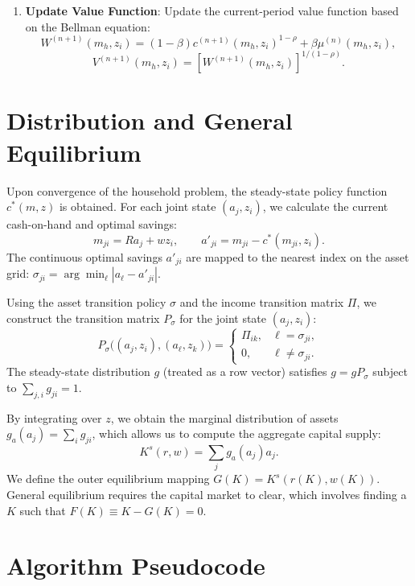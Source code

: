 \documentclass[a4paper,12pt]{article}
\newcommand{\R}{R}
\begin{document}
\begin{enumerate}
    \item \textbf{Update Value Function}: Update the current-period value function based on the Bellman equation:
    \[
        W^{(n+1)}(m_h,z_i) = (1-\beta)c^{(n+1)}(m_h,z_i)^{1-\rho} + \beta\mu^{(n)}(m_h,z_i),
    \]
    \[
        V^{(n+1)}(m_h,z_i) = \left[W^{(n+1)}(m_h,z_i)\right]^{1/(1-\rho)}.
    \]
\end{enumerate}

\section{Distribution and General Equilibrium}

Upon convergence of the household problem, the steady-state policy function $c^\ast(m,z)$ is obtained. For each joint state $(a_j,z_i)$, we calculate the current cash-on-hand and optimal savings:
\[
    m_{ji}=\R a_j+wz_i,\qquad a'_{ji}=m_{ji}-c^\ast(m_{ji},z_i).
\]
The continuous optimal savings $a'_{ji}$ are mapped to the nearest index on the asset grid: $\sigma_{ji} = \arg\min_\ell |a_\ell-a'_{ji}|$.

Using the asset transition policy $\sigma$ and the income transition matrix $\Pi$, we construct the transition matrix $P_\sigma$ for the joint state $(a_j, z_i)$:
\[
    P_\sigma\big((a_j,z_i),(a_\ell,z_k)\big)
    =
    \begin{cases}
        \Pi_{ik}, & \ell=\sigma_{ji},\\
        0, & \ell\neq\sigma_{ji}.
    \end{cases}
\]
The steady-state distribution $g$ (treated as a row vector) satisfies $g=gP_\sigma$ subject to $\sum_{j,i}g_{ji}=1$.

By integrating over $z$, we obtain the marginal distribution of assets $g_a(a_j)=\sum_i g_{ji}$, which allows us to compute the aggregate capital supply:
\[
    K^s(r,w)=\sum_j g_a(a_j)a_j.
\]
We define the outer equilibrium mapping $G(K)=K^s(r(K),w(K))$. General equilibrium requires the capital market to clear, which involves finding a $K$ such that $F(K)\equiv K-G(K)=0$.

\section{Algorithm Pseudocode}
\end{document}
